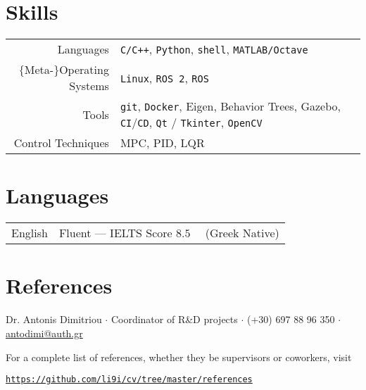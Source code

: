 \documentclass[a4paper,10pt,twoside]{article}
\begin{document}
\section{\textbf{Skills}}

\begin{tabular}{rp{12cm}}
Languages & \texttt{C/C++}, \texttt{Python}, \texttt{shell}, \texttt{MATLAB/Octave} \\
$\{$Meta-$\}$Operating Systems & \texttt{Linux}, \texttt{ROS 2}, \texttt{ROS} \\
  Tools & \texttt{git}, \texttt{Docker}, Eigen, Behavior Trees, Gazebo, \texttt{CI}/\texttt{CD}, \texttt{Qt} / \texttt{Tkinter}, \texttt{OpenCV} \\
Control Techniques & MPC, PID, LQR
\end{tabular}

\section{\textbf{Languages}}

\begin{tabular}{rp{12cm}}
  English & Fluent --- IELTS Score $8.5$ \ \ (Greek Native)
\end{tabular}

\vspace{0.2cm}

\section{\textbf{References}}
\noindent Dr. Antonis Dimitriou $\cdot$ Coordinator of R\&D projects $\cdot$ (+30) 697 88 96 350 $\cdot$ \href{mailto:antodimi@auth.gr}{antodimi@auth.gr}

\noindent For a complete list of references, whether they be supervisors or coworkers, visit
\begin{center}\noindent
\href{https://mozilla.github.io/pdf.js/web/viewer.html?file=https://raw.githubusercontent.com/li9i/cv/master/references/references_alexandros_filotheou.pdf}{\texttt{https://github.com/li9i/cv/tree/master/references}}
\end{center}
\end{document}
